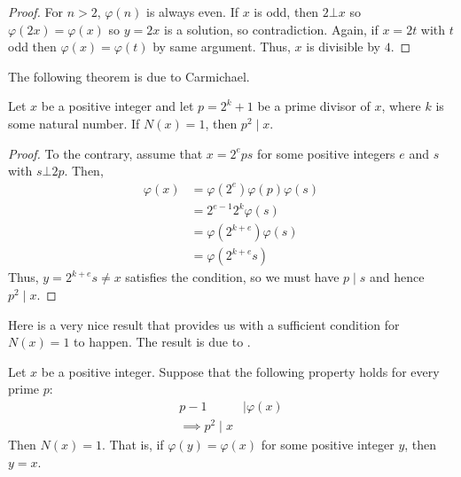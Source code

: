 	\begin{proof}
		For $n>2$, $\varphi(n)$ is always even. If $x$ is odd, then $2\bot x$ so $\varphi(2x)=\varphi(x)$ so $y=2x$ is a solution, so contradiction. Again, if $x=2t$ with $t$ odd then $\varphi(x)=\varphi(t)$ by same argument. Thus, $x$ is divisible by $4$.
	\end{proof}
The following theorem is due to Carmichael.

	\begin{theorem}
		Let $x$ be a positive integer and let $p=2^k+1$ be a prime divisor of $x$, where $k$ is some natural number. If $N(x)=1$, then $p^2\mid x$.
	\end{theorem}

	\begin{proof}
		To the contrary, assume that $x=2^eps$ for some positive integers $e$ and $s$ with $s\bot 2p$. Then,
			\begin{align*}
				\varphi(x)  & = \varphi(2^e)\varphi(p)\varphi(s)\\
						& = 2^{e-1}2^k\varphi(s)\\
						& = \varphi(2^{k+e})\varphi(s)\\
						& = \varphi(2^{k+e}s)
			\end{align*}
		Thus, $y=2^{k+e}s\neq x$ satisfies the condition, so we must have $p\mid s$ and hence $p^2\mid x$.
	\end{proof}
Here is a very nice result that provides us with a sufficient condition for $N(x)=1$ to happen. The result is due to \textcite{pomerance_1974}.
	\begin{theorem}
	 Let $x$ be a positive integer. Suppose that the following property holds for every prime $p$:
			\begin{align*}
				p-1
					& \mid \varphi(x)\\
				\implies p^2\mid x
			\end{align*}
		Then $N(x)=1$. That is, if $\varphi(y)=\varphi(x)$ for some positive integer $y$, then $y=x$.
	\end{theorem}

